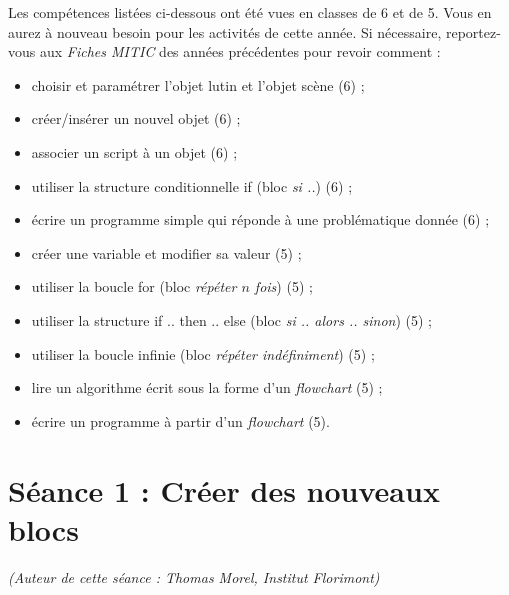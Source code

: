 Les compétences listées ci-dessous ont été vues en classes de 6 et de 5. Vous en aurez à nouveau besoin pour les activités de cette année. Si nécessaire, reportez-vous aux \emph{Fiches MITIC} des années précédentes pour revoir comment :  

\begin{itemize}
\item choisir et paramétrer l'objet lutin et l'objet scène (6) ;
\item créer/insérer un nouvel objet (6) ; 
\item associer un script à un objet (6) ;
\item utiliser la structure conditionnelle if (bloc \emph{si ..}) (6) ; 
\item écrire un programme simple qui réponde à une problématique donnée (6) ;
\item créer une variable et modifier sa valeur (5) ;
\item utiliser la boucle for (bloc \emph{répéter $n$ fois}) (5) ;
\item utiliser la structure if .. then .. else (bloc \emph{si .. alors .. sinon}) (5) ; 
\item utiliser la boucle infinie (bloc \emph{répéter indéfiniment}) (5) ;
\item lire un algorithme écrit sous la forme d'un \emph{flowchart} (5) ;
\item écrire un programme à partir d'un \emph{flowchart} (5).
\end{itemize}













%
%
%
%



\section{Séance 1 : Créer des nouveaux blocs}\label{ficheScratch4e1}

{\footnotesize \emph{(Auteur de cette séance : Thomas Morel, Institut Florimont)}}

\vspace{6pt}

